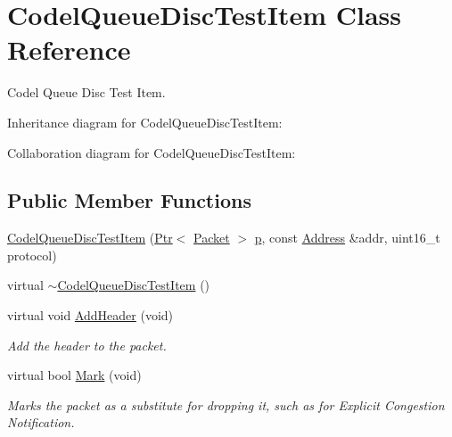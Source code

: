 \hypertarget{classCodelQueueDiscTestItem}{}\section{Codel\+Queue\+Disc\+Test\+Item Class Reference}
\label{classCodelQueueDiscTestItem}


Codel Queue Disc Test Item.  




Inheritance diagram for Codel\+Queue\+Disc\+Test\+Item\+:


Collaboration diagram for Codel\+Queue\+Disc\+Test\+Item\+:
\subsection*{Public Member Functions}
\begin{DoxyCompactItemize}
\item 
\hyperlink{classCodelQueueDiscTestItem_a080f662d50b0de0691c3baec96498bcb}{Codel\+Queue\+Disc\+Test\+Item} (\hyperlink{classns3_1_1Ptr}{Ptr}$<$ \hyperlink{classns3_1_1Packet}{Packet} $>$ \hyperlink{lte__link__budget__x2__handover__measures_8m_ac9de518908a968428863f829398a4e62}{p}, const \hyperlink{classns3_1_1Address}{Address} \&addr, uint16\+\_\+t protocol)
\item 
virtual \hyperlink{classCodelQueueDiscTestItem_a93912f7a515fcf81f741a6b6d3fa0330}{$\sim$\+Codel\+Queue\+Disc\+Test\+Item} ()
\item 
virtual void \hyperlink{classCodelQueueDiscTestItem_a5761f047c0eb3c54c57152307ef7ecda}{Add\+Header} (void)
\begin{DoxyCompactList}\small\item\em Add the header to the packet. \end{DoxyCompactList}\item 
virtual bool \hyperlink{classCodelQueueDiscTestItem_ac54852fb59f6523cc1e0c4dd7324d081}{Mark} (void)
\begin{DoxyCompactList}\small\item\em Marks the packet as a substitute for dropping it, such as for Explicit Congestion Notification. \end{DoxyCompactList}\end{DoxyCompactItemize}
